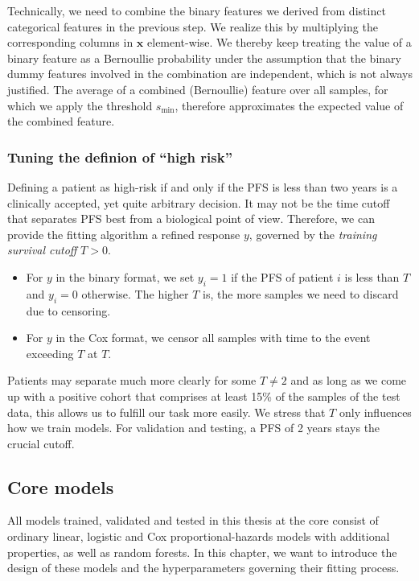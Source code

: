 Technically, we need to combine the binary features we derived from distinct categorical features 
in the previous step. We realize this by multiplying the corresponding columns in 
$\mathbf{x}$ element-wise. We thereby keep treating the value of a binary feature as a Bernoullie
probability under the assumption that the binary dummy features involved in the combination are 
independent, which is not always justified. The average of a combined (Bernoullie) feature over all 
samples, for which we apply the threshold $s_\text{min}$, therefore approximates the expected value 
of the combined feature.

\subsubsection{Tuning the definion of ``high risk''}

Defining a patient as high-risk if and only if the PFS is less than two years
is a clinically accepted, yet quite arbitrary decision. It may not be the time cutoff that 
separates PFS best from a biological point of view. Therefore, we can provide the fitting 
algorithm a refined response $y$, governed by the \textit{training survival cutoff} $T > 0$.
\begin{itemize}
    \item For $y$ in the binary format, we set $y_i = 1$ if the PFS 
        of patient $i$ is less than $T$ and $y_i = 0$ otherwise. The higher $T$ is, the more 
        samples we need to discard due to censoring.
    \item For $y$ in the Cox format, we censor all samples with time to the event exceeding $T$ at 
        $T$.
\end{itemize}
Patients may separate much more clearly for some $T \neq 2$ and as long as we come up 
with a positive cohort that comprises at least 15\% of the samples of the test data, this allows us 
to fulfill our task more easily. We stress that $T$ only influences how we train models. For 
validation and testing, a PFS of \num{2} years stays the crucial cutoff.

\subsection{Core models}\label{subsec:core-models}

All models trained, validated and tested in this thesis at the core consist of ordinary linear, 
logistic and Cox proportional-hazards models with additional properties, as well as random forests.
In this chapter, we want to introduce the design of these models and the hyperparameters governing 
their fitting process.

